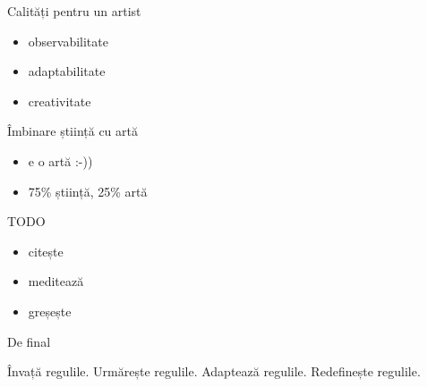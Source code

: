 \documentclass{beamer}
\begin{document}
\begin{frame}{Calități pentru un artist}
  \begin{itemize}
    \item observabilitate
    \item adaptabilitate
    \item creativitate
  \end{itemize}
\end{frame}

\begin{frame}{Îmbinare știință cu artă}
  \begin{itemize}
    \item e o artă :-))
    \item 75\% știință, 25\% artă
  \end{itemize}
\end{frame}

\begin{frame}{TODO}
  \begin{itemize}
    \item citește
    \item meditează
    \item greșește
  \end{itemize}
\end{frame}

\begin{frame}{De final}
  \begin{center}
    Învață regulile. Urmărește regulile. Adaptează regulile. Redefinește regulile.
  \end{center}
\end{frame}
\end{document}
